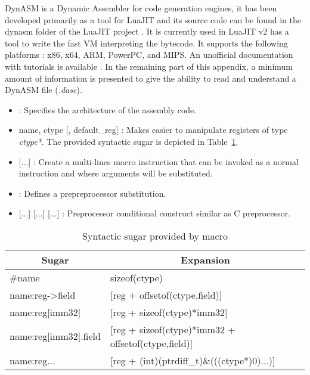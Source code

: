 
DynASM is a Dynamic Assembler for code generation engines, it has been developed
primarily as a tool for LuaJIT and its source code can be found in the dynasm
folder of the LuaJIT project \cite{luajit-src}. It is currently used in LuaJIT
v2 has a tool to write the fast VM interpreting the bytecode. It supports the
following platforms : x86, x64, ARM, PowerPC, and MIPS. An unofficial
documentation with tutorials is available \cite{dynasm}. In the remaining part
of this appendix, a minimum amount of information is presented to give the
ability to read and understand a DynASM file (\emph{.dasc}).



\begin{itemize}
    \item {} : Specifies the architecture of the assembly code.
    \item {} name, ctype [, default\_reg] : Makes easier to manipulate registers of type \emph{ctype*}. The provided syntactic sugar is depicted in
Table~\ref{tab:type-sugar}.
    \item {} [...]  : Create a multi-lines
macro instruction that can be invoked as a normal instruction and where arguments
will be substituted.
    \item {} : Defines a prepreprocessor substitution.
    \item {} [...]  [...]  [...]  : Preprocessor conditional construct similar as C preprocessor.
\end{itemize}

\begin{table}
\centering
\begin{tabular}{|l|l|}
\hline
\multicolumn{1}{|c|}{Sugar} & \multicolumn{1}{c|}{Expansion} \\\hline
\#name                      & sizeof(ctype)\\
name:reg-\textgreater field & [reg + offsetof(ctype,field)]\\
name:reg[imm32]             & [reg + sizeof(ctype)*imm32]\\
name:reg[imm32].field       & [reg + sizeof(ctype)*imm32 + offsetof(ctype,field)]\\
name:reg...                 & [reg + (int)(ptrdiff\_t)\&(((ctype*)0)...)]\\\hline
\end{tabular}
\caption{Syntactic sugar provided by  macro}
\label{tab:type-sugar}
\end{table}

